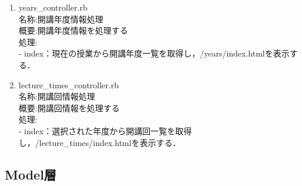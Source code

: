 \begin{enumerate}
  \item  years\_controller.rb\\
名称:開講年度情報処理\\
概要:開講年度情報を処理する\\
処理:\\
- index：現在の授業から開講年度一覧を取得し，/years/index.htmlを表示する．

  \item  lecture\_times\_controller.rb\\
名称:開講回情報処理\\
概要:開講回情報を処理する\\
処理:\\
- index：選択された年度から開講回一覧を取得し，/lecture\_times/index.htmlを表示する．

\end{enumerate}



\newpage

\subsection{Model層}

